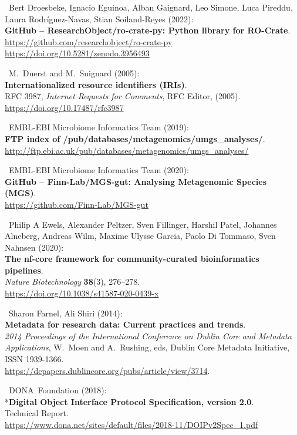 \begin{thebibliography}{9}
~Bert Droesbeke, Ignacio Eguinoa, Alban Gaignard, Leo Simone,
Luca Pireddu, Laura Rodríguez-Navas, Stian Soiland-Reyes (2022):\\
\textbf{GitHub -- ResearchObject/ro-crate-py: Python library for
RO-Crate}.\\
\url{https://github.com/researchobject/ro-crate-py}~\\
\url{https://doi.org/10.5281/zenodo.3956493}

~M.~Duerst and M.~Suignard (2005):\\
\textbf{Internationalized resource identifiers (IRIs)}.\\
RFC 3987, \emph{Internet Requests for Comments}, RFC Editor, (2005).\\
\url{https://doi.org/10.17487/rfc3987}

~EMBL-EBI Microbiome Informatics Team (2019):\\
\textbf{FTP index of /pub/databases/metagenomics/umgs\_analyses/}.\\
\url{http://ftp.ebi.ac.uk/pub/databases/metagenomics/umgs_analyses/}

~EMBL-EBI Microbiome Informatics Team (2020):\\
\textbf{GitHub -- Finn-Lab/MGS-gut: Analysing Metagenomic Species
(MGS)}.\\
\url{https://github.com/Finn-Lab/MGS-gut}

~Philip A Ewels, Alexander Peltzer, Sven Fillinger, Harshil
Patel, Johannes Alneberg, Andreas Wilm, Maxime Ulysse Garcia, Paolo Di
Tommaso, Sven Nahnsen (2020):\\
\textbf{The nf-core framework for community-curated bioinformatics
pipelines}.\\
\emph{Nature Biotechnology} \textbf{38}(3), 276--278.\\
\url{https://doi.org/10.1038/s41587-020-0439-x}

~Sharon Farnel, Ali Shiri (2014):\\
\textbf{Metadata for research data: Current practices and trends}.\\
\emph{2014 Proceedings of the International Conference on Dublin Core
and Metadata Applications}, W.~Moen and A.~Rushing, eds, Dublin Core
Metadata Initiative, ISSN 1939-1366.\\
\url{https://dcpapers.dublincore.org/pubs/article/view/3714}.

~DONA~Foundation (2018):\\
*\textbf{Digital Object Interface Protocol Specification, version
2.0}.\\
Technical Report.\\
\url{https://www.dona.net/sites/default/files/2018-11/DOIPv2Spec_1.pdf}


\end{thebibliography}
